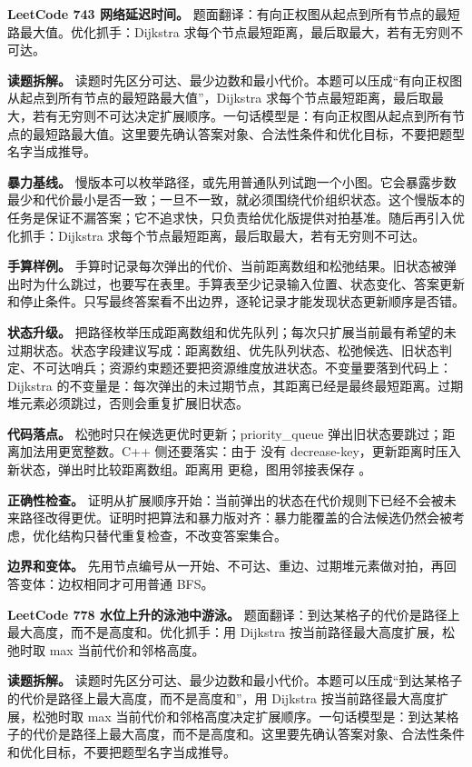\noindent\textbf{LeetCode 743 网络延迟时间。} 题面翻译：有向正权图从起点到所有节点的最短路最大值。优化抓手：Dijkstra 求每个节点最短距离，最后取最大，若有无穷则不可达。

\textbf{读题拆解。} 读题时先区分可达、最少边数和最小代价。本题可以压成“有向正权图从起点到所有节点的最短路最大值”，Dijkstra 求每个节点最短距离，最后取最大，若有无穷则不可达决定扩展顺序。一句话模型是：有向正权图从起点到所有节点的最短路最大值。这里要先确认答案对象、合法性条件和优化目标，不要把题型名字当成推导。

\textbf{暴力基线。} 慢版本可以枚举路径，或先用普通队列试跑一个小图。它会暴露步数最少和代价最小是否一致；一旦不一致，就必须围绕代价组织状态。这个慢版本的任务是保证不漏答案；它不追求快，只负责给优化版提供对拍基准。随后再引入优化抓手：Dijkstra 求每个节点最短距离，最后取最大，若有无穷则不可达。

\textbf{手算样例。} 手算时记录每次弹出的代价、当前距离数组和松弛结果。旧状态被弹出时为什么跳过，也要写在表里。手算表至少记录输入位置、状态变化、答案更新和停止条件。只写最终答案看不出边界，逐轮记录才能发现状态更新顺序是否错。

\textbf{状态升级。} 把路径枚举压成距离数组和优先队列；每次只扩展当前最有希望的未过期状态。状态字段建议写成：距离数组、优先队列状态、松弛候选、旧状态判定、不可达哨兵；资源约束题还要把资源维度放进状态。不变量要落到代码上：Dijkstra 的不变量是：每次弹出的未过期节点，其距离已经是最终最短距离。过期堆元素必须跳过，否则会重复扩展旧状态。

\textbf{代码落点。} 松弛时只在候选更优时更新；priority\_queue 弹出旧状态要跳过；距离加法用更宽整数。C++ 侧还要落实：由于  没有 decrease-key，更新距离时压入新状态，弹出时比较距离数组。距离用  更稳，图用邻接表保存 。

\textbf{正确性检查。} 证明从扩展顺序开始：当前弹出的状态在代价规则下已经不会被未来路径改得更优。证明时把算法和暴力版对齐：暴力能覆盖的合法候选仍然会被考虑，优化结构只替代重复检查，不改变答案集合。

\textbf{边界和变体。} 先用节点编号从一开始、不可达、重边、过期堆元素做对拍，再回答变体：边权相同才可用普通 BFS。

\noindent\textbf{LeetCode 778 水位上升的泳池中游泳。} 题面翻译：到达某格子的代价是路径上最大高度，而不是高度和。优化抓手：用 Dijkstra 按当前路径最大高度扩展，松弛时取 max 当前代价和邻格高度。

\textbf{读题拆解。} 读题时先区分可达、最少边数和最小代价。本题可以压成“到达某格子的代价是路径上最大高度，而不是高度和”，用 Dijkstra 按当前路径最大高度扩展，松弛时取 max 当前代价和邻格高度决定扩展顺序。一句话模型是：到达某格子的代价是路径上最大高度，而不是高度和。这里要先确认答案对象、合法性条件和优化目标，不要把题型名字当成推导。

